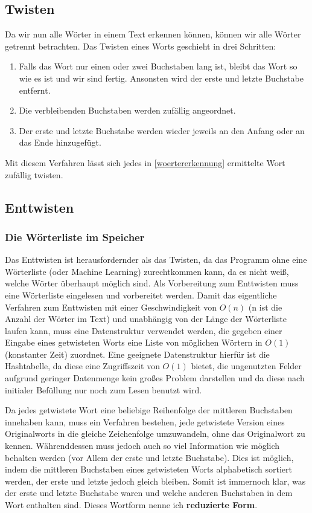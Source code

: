 \documentclass[a4paper,10pt,ngerman]{scrartcl}
\begin{document}
\subsection{Twisten}
Da wir nun alle Wörter in einem Text erkennen können, können wir alle Wörter getrennt betrachten. Das Twisten eines Worts geschieht in drei Schritten:
\begin{enumerate}
  \item Falls das Wort nur einen oder zwei Buchstaben lang ist, bleibt das Wort so wie es ist und wir sind fertig. Ansonsten wird der erste und letzte Buchstabe entfernt. 
  \item Die verbleibenden Buchstaben werden zufällig angeordnet.
  \item Der erste und letzte Buchstabe werden wieder jeweils an den Anfang oder an das Ende hinzugefügt.
\end{enumerate}
Mit diesem Verfahren lässt sich jedes in \ref{woertererkennung} ermittelte Wort zufällig twisten.

\subsection{Enttwisten}

\subsubsection{Die Wörterliste im Speicher}
Das Enttwisten ist herausfordernder als das Twisten, da das Programm ohne eine Wörterliste (oder Machine Learning) zurechtkommen kann, da es nicht weiß, welche Wörter überhaupt möglich sind. Als Vorbereitung zum Enttwisten muss eine Wörterliste eingelesen und vorbereitet werden. Damit das eigentliche Verfahren zum Enttwisten mit einer Geschwindigkeit von $O(n)$ (n ist die Anzahl der Wörter im Text) und unabhängig von der Länge der Wörterliste laufen kann, muss eine Datenstruktur verwendet werden, die gegeben einer Eingabe eines getwisteten Worts eine Liste von möglichen Wörtern in $O(1)$ (konstanter Zeit) zuordnet. Eine geeignete Datenstruktur hierfür ist die Hashtabelle, da diese eine Zugriffszeit von $O(1)$ bietet, die ungenutzten Felder aufgrund geringer Datenmenge kein großes Problem darstellen und da diese nach initialer Befüllung nur noch zum Lesen benutzt wird. 

Da jedes getwistete Wort eine beliebige Reihenfolge der mittleren Buchstaben innehaben kann, muss ein Verfahren bestehen, jede getwistete Version eines Originalworts in die gleiche Zeichenfolge umzuwandeln, ohne das Originalwort zu kennen. Währenddessen muss jedoch auch so viel Information wie möglich behalten werden (vor Allem der erste und letzte Buchstabe). Dies ist möglich, indem die mittleren Buchstaben eines getwisteten Worts alphabetisch sortiert werden, der erste und letzte jedoch gleich bleiben. Somit ist immernoch klar, was der erste und letzte Buchstabe waren und welche anderen Buchstaben in dem Wort enthalten sind. Dieses Wortform nenne ich \textbf{reduzierte Form}.
\end{document}
